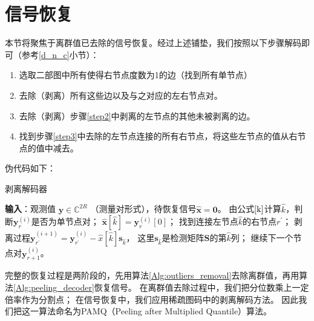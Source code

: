 \documentclass[AutoFakeBold]{LZUThesis}
\begin{document}
\section{信号恢复}
\label{solu}

本节将聚焦于离群值已去除的信号恢复。经过上述铺垫，我们按照以下步骤解码即可（参考\ref{d_n_c}小节）：

\begin{enumerate}[1) ]
    \item 选取二部图中所有使得右节点度数为1的边（找到所有单节点）
    \item \label{step2}去除（剥离）所有这些边以及与之对应的左右节点对。
    \item \label{step3}去除（剥离）步骤\ref{step2}中剥离的左节点的其他未被剥离的边。
    \item 找到步骤\ref{step3}中去除的左节点连接的所有右节点，将这些左节点的值从右节点的值中减去。
\end{enumerate}

伪代码如下：

\begin{algorithm}[H]
    \caption{剥离解码器\label{Alg:peeling_decoder}}
    \begin{algorithmic}[1]
        \State \textbf{输入}：观测值 $ \mathbf{y} \in \mathbb{C}^{2R} $ （测量对形式），待恢复信号$\mathbf{\hat x} = \mathbf{0}$。
            \State 由公式$\ref{k}$计算$\hat k$，判断$\mathbf{y}_r^{(i)}$是否为单节点对；
                    \State $\mathbf{\hat x}[\hat k] = \mathbf{y}_r^{(i)}[0]$；
                        \State 找到连接左节点$\hat k$的右节点$r^{\prime}$；
                        \State 剥离过程$\mathbf{y}_{r^{\prime}}^{(i+1)} = \mathbf{y}_{r^{\prime}}^{(i)} - \hat{x}[\hat k]\mathbf{s}_{\hat k}$，
                        这里$\mathbf{s}_{\hat k}$是检测矩阵$\mathbf{S}$的第$\hat k$列；
                    \EndFor
                \Else
                    \State 继续下一个节点对$\mathbf{y}_{r+1}^{(i)}$。
                \EndIf
            \EndFor
        \EndFor
    \end{algorithmic}
\end{algorithm}

完整的恢复过程是两阶段的，先用算法\ref{Alg:outliers_removal}去除离群值，再用算法\ref{Alg:peeling_decoder}恢复信号。
在离群值去除过程中，我们把分位数乘上一定倍率作为分割点；
在信号恢复中，我们应用稀疏图码中的剥离解码方法。
因此我们把这一算法命名为PAMQ（Peeling after Multiplied Quantile）算法。
\end{document}

